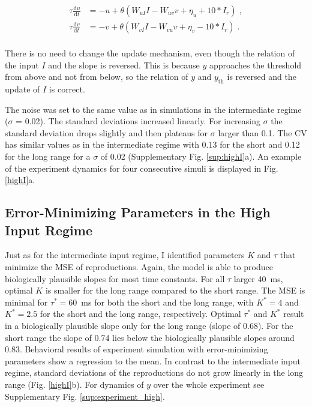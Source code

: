 \documentclass[10pt]{article}
\begin{document}
\begin{equation} \label{EqhighI}
	\begin{split}
	\tau\frac{\text{d}u}{\text{d}t} & = -u + \theta(W_{uI}I - W_{uv}v + \eta_u + 10*I_r) \;,\\
	\tau\frac{\text{d}v}{\text{d}t} & = -v + \theta(W_{vI}I - W_{vu}v + \eta_v - 10*I_r) \;.\\
	\end{split}
\end{equation}

There is no need to change the update mechanism, even though the relation of the input $I$ and the slope is reversed. This is because $y$ approaches the threshold from above and not from below, so the relation of $y$ and $y_{\text{th}}$ is reversed and the update of $I$ is correct. 

The noise was set to the same value as in simulations in the intermediate regime ($\sigma$ = 0.02). The standard deviations increased linearly. For increasing $\sigma$ the standard deviation drops slightly and then plateaus for $\sigma$ larger than 0.1. The CV has similar values as in the intermediate regime with 0.13 for the short and 0.12 for the long range for a $\sigma$ of 0.02 (Supplementary Fig. \ref{sup:highI}a). 
An example of the experiment dynamics for four consecutive simuli is displayed in Fig. \ref{highI}a.

\subsection{Error-Minimizing Parameters in the High Input Regime}
Just as for the intermediate input regime, I identified parameters $K$ and $\tau$ that minimize the MSE of reproductions. 
Again, the model is able to produce biologically plausible slopes for most time constants. 
For all $\tau$ larger 40~ms, optimal $K$ is smaller for the long range compared to the short range.
The MSE is minimal for $\tau^* = 60$~ms for both the short and the long range, with $K^* = 4$ and $K^* = 2.5$  for the short and the long range, respectively. Optimal $\tau^*$ and $K^*$ result in a biologically plausible slope only for the long range (slope of 0.68). For the short range the slope of 0.74 lies below the biologically plausible slopes around 0.83.
Behavioral results of experiment simulation with error-minimizing parameters show a regression to the mean. In contrast to the intermediate input regime, standard deviations of the reproductions do not grow linearly in the long range (Fig. \ref{highI}b).
For dynamics of $y$ over the whole experiment see Supplementary Fig. \ref{sup:experiment_high}.
\end{document}
